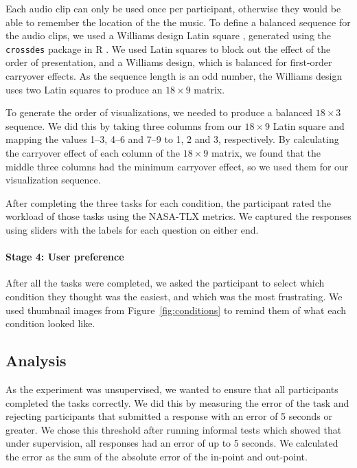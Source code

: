 Each audio clip can only be used once per participant, otherwise they would be able to remember the location of the the
music. To define a balanced sequence for the audio clips, we used a Williams design Latin square \citep{Williams1949},
generated using the \texttt{crossdes} package in R \citep{Sailer2013}. We used Latin squares to block out the effect of
the order of presentation, and a Williams design, which is balanced for first-order carryover effects.  As the sequence
length is an odd number, the Williams design uses two Latin squares to produce an $18\times9$ matrix.

To generate the order of visualizations, we needed to produce a balanced $18\times3$ sequence. We did this by taking
three columns from our $18\times9$ Latin square and mapping the values 1--3, 4--6 and 7--9 to 1, 2 and 3, respectively.
By calculating the carryover effect of each column of the $18\times9$ matrix, we found that the middle three columns
had the minimum carryover effect, so we used them for our visualization sequence.


After completing the three tasks for each condition, the participant rated the workload of those tasks
using the NASA-TLX metrics. We captured the responses using sliders with the labels for each question on either end.

\paragraph{Stage 4: User preference}
After all the tasks were completed, we asked the participant to select which condition they thought was the easiest,
and which was the most frustrating. We used thumbnail images from Figure~\ref{fig:conditions} to remind them of what
each condition looked like.

\subsection{Analysis}\label{sec:waveform-analysis}
As the experiment was unsupervised, we wanted to ensure that all participants completed the tasks correctly.  We did
this by measuring the error of the task and rejecting participants that submitted a response with an error of 5 seconds
or greater. We chose this threshold after running informal tests which showed that under supervision, all responses had
an error of up to 5 seconds.  We calculated the error as the sum of the absolute error of the in-point and
out-point.


